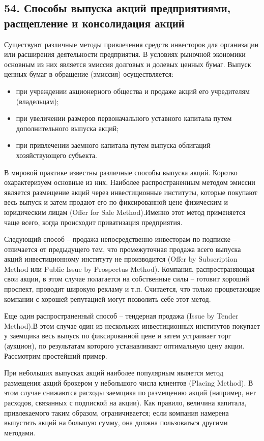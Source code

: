 \subsection*{54. Способы выпуска акций предприятиями, расщепление и консолидация акций}

Существуют различные методы привлечения средств инвесторов для организации или расширения деятельности предприятия. В условиях рыночной экономики основным из них является эмиссия долговых и долевых ценных бумаг. Выпуск ценных бумаг в обращение (эмиссия) осуществляется: 
\begin{itemize}
	\item при учреждении акционерного общества и продаже акций его учредителям (владельцам); 
\item при увеличении размеров первоначального уставного капитала путем дополнительного выпуска акций; 
\item при привлечении заемного капитала путем выпуска облигаций хозяйствующего субъекта. 
\end{itemize}

В мировой практике известны различные способы выпуска акций. Коротко охарактеризуем основные из них. 
Наиболее распространенным методом эмиссии является размещение акций через инвестиционные институты, которые покупают весь выпуск и затем продают его по фиксированной цене физическим и юридическим лицам (Offer for Sale Method).Именно этот метод применяется чаще всего, когда происходит приватизация предприятия. 

Следующий способ – продажа непосредственно инвесторам по подписке – отличается от предыдущего тем, что промежуточная продажа всего выпуска акций инвестиционному институту не производится (Offer by Subscription Method или Public Issue by Prospectus Method). Компания, распространяющая свои акции, в этом случае полагается на собственные силы – готовит хороший проспект, проводит широкую рекламу и т.п. Считается, что только процветающие компании с хорошей репутацией могут позволить себе этот метод. 

Еще один распространенный способ – тендерная продажа (Issue by Tender Method).В этом случае один из нескольких инвестиционных институтов покупает у заемщика весь выпуск по фиксированной цене и затем устраивает торг (аукцион), по результатам которого устанавливают оптимальную цену акции. Рассмотрим простейший пример. 

При небольших выпусках акций наиболее популярным является метод размещения акций брокером у небольшого числа клиентов (Placing Method). В этом случае снижаются расходы заемщика по размещению акций (например, нет расходов, связанных с подпиской на акции). Как правило, величина капитала, привлекаемого таким образом, ограничивается; если компания намерена выпустить акций на большую сумму, она должна пользоваться другими методами. 

